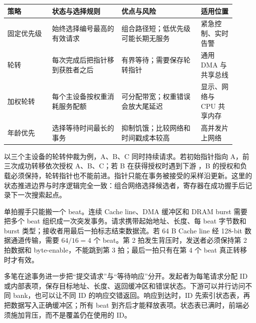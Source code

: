 \begin{longtable}{L{0.18\linewidth}L{0.28\linewidth}L{0.32\linewidth}L{0.14\linewidth}}
\toprule
策略 & 状态与选择规则 & 优点与风险 & 适用位置 \\
\midrule
固定优先级 & 始终选择编号最高的有效请求 & 组合路径短；低优先级可能长期无服务 & 紧急控制、实时告警 \\
轮转 & 每次完成后把指针移到获胜者之后 & 有界等待；需要保存轮转指针 & 通用 DMA 与共享总线 \\
加权轮转 & 每个主设备按权重消耗服务配额 & 可分配带宽；权重错误会放大尾延迟 & 显示、网络与 CPU 共享内存 \\
年龄优先 & 选择等待时间最长的事务 & 抑制饥饿；比较网络和时间戳成本较高 & 高并发片上网络 \\
\bottomrule
\end{longtable}

以三个主设备的轮转仲裁为例，A、B、C 同时持续请求。若初始指针指向 A，前三次成功转移依次授权 A、B、C；若 B 在获得授权时遇到下游 ，B 的授权和负载必须保持，轮转指针也不能前进。指针只能在事务被接受的采样沿更新。这里的状态推进边界与时序逻辑完全一致：组合网络选择候选者，寄存器在成功握手后记录下一次搜索起点。

单拍握手只能搬一个 beat。连续 Cache line、DMA 缓冲区和 DRAM burst 需要把多个 beat 组织成一次突发事务。请求携带起始地址、长度、每 beat 字节数和 burst 类型；接收者用最后一拍标志结束数据流。若 64 B Cache line 经 128-bit 数据通道传输，需要 $64/16=4$ 个 beat。第 2 拍发生背压时，发送者必须保持第 2 拍数据和 byte-enable，不能跳到第 3 拍；最后一拍只有在第 4 个 beat 真正转移时才有效。

多笔在途事务进一步把“提交请求”与“等待响应”分开。发起者为每笔请求分配 ID 或内部表项，保存目标地址、长度、返回缓冲区和错误状态。下游可以并行访问不同 bank，也可以让不同 ID 的响应交错返回。响应到达时，ID 先索引状态表，再把数据写入正确缓冲区；所有 beat 到齐后才能释放表项。状态表已满时，前端必须施加背压，而不是覆盖仍在使用的 ID。

